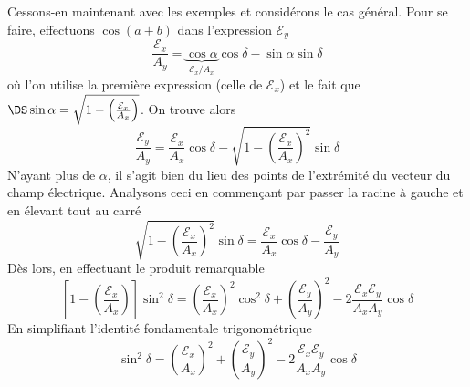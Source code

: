 	Cessons-en maintenant avec les exemples et considérons le cas général. Pour se faire, effectuons
	$\cos(a+b)$ dans l'expression $\mathcal{E}_y$
	\begin{equation}
	\frac{\mathcal{E}_x}{A_y} = \underbrace{\cos\alpha}_{\mathcal{E}_x/A_x}\cos\delta-\sin\alpha\sin\delta
	\end{equation}
	où l'on utilise la première expression (celle de $\mathcal{E}_x$) et le fait que $\DS \sin\alpha = 
	\sqrt{1-\left(\frac{\mathcal{E}_x}{A_x}\right)}$. On trouve alors
	\begin{equation}
	\frac{\mathcal{E}_y}{A_y} = \frac{\mathcal{E}_x}{A_x}\cos\delta -\sqrt{1-\left(\frac{\mathcal{E}_x}{
	A_x}\right)^2}\sin\delta
	\end{equation}
	N'ayant plus de $\alpha$, il s'agit bien du lieu des points de l'extrémité du vecteur du champ électrique. 
	Analysons ceci en commençant par passer la racine à gauche et en élevant tout au carré
	\begin{equation}
	\sqrt{1-\left(\frac{\mathcal{E}_x}{A_x}\right)^2}\sin\delta = \frac{\mathcal{E}_x}{A_x}\cos\delta -
	\frac{\mathcal{E}_y}{A_y} 
	\end{equation}
	Dès lors, en effectuant le produit remarquable
	\begin{equation}
	\left[1-\left(\frac{\mathcal{E}_x}{A_x}\right)\right]\sin^2\delta = \left(\frac{\mathcal{E}_x}{A_x}\right)^2
	\cos^2\delta +\left(\frac{\mathcal{E}_y}{A_y}\right)^2- 2\frac{\mathcal{E}_x\mathcal{E}_y}{A_xA_y}\cos\delta
	\end{equation}
	En simplifiant l'identité fondamentale trigonométrique
	\begin{equation}
	\sin^2\delta = \left(\frac{\mathcal{E}_x}{A_x}\right)^2
	+\left(\frac{\mathcal{E}_y}{A_y}\right)^2- 2\frac{\mathcal{E}_x\mathcal{E}_y}{A_xA_y}\cos\delta
	\end{equation}
	
